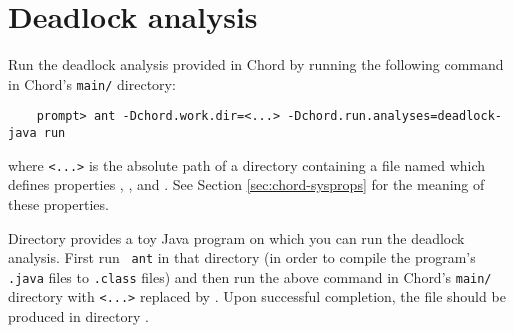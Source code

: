 \section{Deadlock analysis}
\label{sec:deadlock}

Run the deadlock analysis provided in Chord by running the following
command in Chord's {\tt main/} directory:

\begin{verbatim}
    prompt> ant -Dchord.work.dir=<...> -Dchord.run.analyses=deadlock-java run
\end{verbatim}

\noindent where {\tt <...>} is the absolute path of a directory
containing a file named  which defines
properties , , and
.  See Section \ref{sec:chord-sysprops} for the
meaning of these properties.

Directory  provides a toy Java
program on which you can run the deadlock analysis.  First run {\tt
  ant} in that directory (in order to compile the program's {\tt
  .java} files to {\tt .class} files) and then run the above command
in Chord's {\tt main/} directory with {\tt <...>} replaced by
.  Upon successful completion, the
file  should be produced in directory
.


